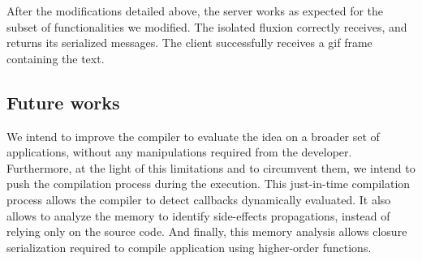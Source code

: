 After the modifications detailed above, the server works as expected for the subset of functionalities we modified.
The isolated fluxion correctly receives, and returns its serialized messages.
The client successfully receives a gif frame containing the text.

\subsection{Future works}

We intend to improve the compiler to evaluate the idea on a broader set of applications, without any manipulations required from the developer.
Furthermore, at the light of this limitations and to circumvent them, we intend to push the compilation process during the execution.
This just-in-time compilation process allows the compiler to detect callbacks dynamically evaluated.
It also allows to analyze the memory to identify side-effects propagations, instead of relying only on the source code.
And finally, this memory analysis allows closure serialization required to compile application using higher-order functions.



